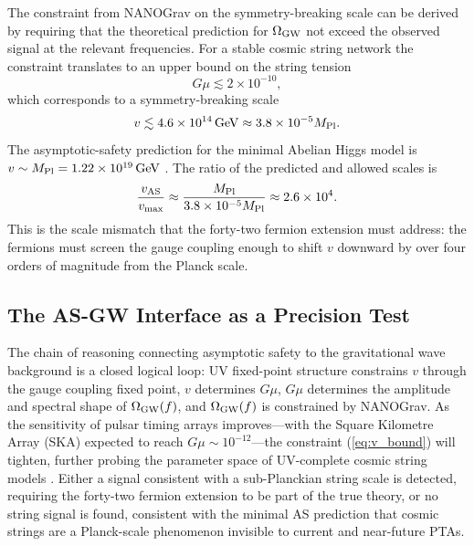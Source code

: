 \documentclass[12pt,a4paper]{article}
\begin{document}
The constraint from NANOGrav on the symmetry-breaking scale can be derived
by requiring that the theoretical prediction for $\Omega_{\rm GW}$ not exceed
the observed signal at the relevant frequencies. For a stable cosmic string
network the constraint translates to an upper bound on the string tension
\begin{equation}
G\mu \lesssim 2\times 10^{-10},
\end{equation}
which corresponds to a symmetry-breaking scale
\begin{equation}
v \lesssim 4.6\times 10^{14}\,{\rm GeV} \approx 3.8\times 10^{-5}M_{\rm Pl}.
\label{eq:v_bound}
\end{equation}
The asymptotic-safety prediction for the minimal Abelian Higgs model is
$v \sim M_{\rm Pl} = 1.22\times 10^{19}\,{\rm GeV}$ \cite{EichhornLinoMiqueleto2023}.
The ratio of the predicted and allowed scales is
\begin{equation}
\frac{v_{\rm AS}}{v_{\rm max}}
\approx \frac{M_{\rm Pl}}{3.8\times 10^{-5}M_{\rm Pl}}
\approx 2.6\times 10^4.
\end{equation}
This is the scale mismatch that the forty-two fermion extension must address:
the fermions must screen the gauge coupling enough to shift $v$ downward by
over four orders of magnitude from the Planck scale.

\subsection{The AS-GW Interface as a Precision Test}

The chain of reasoning connecting asymptotic safety to the gravitational
wave background is a closed logical loop: UV fixed-point structure constrains
$v$ through the gauge coupling fixed point, $v$ determines $G\mu$, $G\mu$
determines the amplitude and spectral shape of $\Omega_{\rm GW}(f)$, and
$\Omega_{\rm GW}(f)$ is constrained by NANOGrav. As the sensitivity of pulsar
timing arrays improves---with the Square Kilometre Array (SKA) expected to
reach $G\mu \sim 10^{-12}$---the constraint (\ref{eq:v_bound}) will tighten,
further probing the parameter space of UV-complete cosmic string models
\cite{EichhornLinoMiqueleto2023,BuoninfanteEtal2025}. Either a signal
consistent with a sub-Planckian string scale is detected, requiring the
forty-two fermion extension to be part of the true theory, or no string
signal is found, consistent with the minimal AS prediction that cosmic strings
are a Planck-scale phenomenon invisible to current and near-future PTAs.
\end{document}
